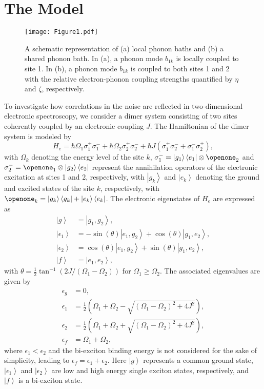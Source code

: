 \documentclass[%
 reprint,%
 amssymb, amsmath,%
 aip,cha,%
]{revtex4-1}
\newcommand{\bra}[1]{\ensuremath{\left\langle{#1}\right\vert}}
\newcommand{\ket}[1]{\ensuremath{\left|{#1}\right\rangle}}
\begin{document}

\section{The Model}

\begin{figure}[t]
	\texttt{[image: Figure1.pdf]}
	\caption{A schematic representation of (a) local phonon baths and (b) a shared phonon bath. In (a), a phonon mode $b_{1k}$ is locally coupled to site 1. In (b), a phonon mode $b_{1k}$ is coupled to both sites 1 and 2 with the relative electron-phonon coupling strengths quantified by $\eta$ and $\zeta$, respectively.}
	\label{figureindex1} 
\end{figure}

To investigate how correlations in the noise are reflected in two-dimensional electronic spectroscopy, we consider a dimer system consisting of two sites coherently coupled by an electronic coupling $J$. The Hamiltonian of the dimer system is modeled by
\begin{equation}
	H_e=\hbar\Omega_1\sigma_{1}^{+}\sigma_{1}^{-}+\hbar\Omega_2\sigma_{2}^{+}\sigma^-_{2}+\hbar J(\sigma_{1}^{+}\sigma^-_{2}+\sigma_{1}^{-}\sigma^+_{2}),
\end{equation}
with $\Omega_k$ denoting the energy level of the site $k$, $\sigma^-_{1}=\ket{g_1}\bra{e_1}\otimes\openone_2$ and $\sigma^-_{2}=\openone_1\otimes\ket{g_2}\bra{e_2}$ represent the annihilation operators of the electronic excitation at sites 1 and 2, respectively, with $\ket{g_k}$ and $\ket{e_k}$ denoting the ground and excited states of the site $k$, respectively, with $\openone_k=\ket{g_k}\bra{g_k}+\ket{e_k}\bra{e_k}$. The electronic eigenstates of $H_e$ are expressed as
 \begin{align}
\ket{g}&=\ket{g_1,g_2},\\
\ket{\epsilon_1}&=-\sin(\theta)\ket{e_1,g_2}+\cos(\theta)\ket{g_1,e_2},\label{eq:evec1}\\
\ket{\epsilon_2}&=\cos(\theta)\ket{e_1,g_2}+\sin(\theta)\ket{g_1,e_2},\label{eq:evec2}\\
\ket{f}&=\ket{e_1,e_2},
 \end{align}
 with $\theta=\frac{1}{2}\tan^{-1}(2J/(\Omega_1-\Omega_2))$ for $\Omega_1\ge\Omega_2$. The associated eigenvalues are given by
 \begin{align}
\epsilon_g&=0,\\
\epsilon_1&=\frac{1}{2}\left(\Omega_1+\Omega_2-\sqrt{(\Omega_1-\Omega_2)^{2}+4J^{2}}\right),\label{eq:e1}\\
\epsilon_2&=\frac{1}{2}\left(\Omega_1+\Omega_2+\sqrt{(\Omega_1-\Omega_2)^{2}+4J^{2}}\right),\label{eq:e2}\\
\epsilon_f&=\Omega_1+\Omega_2,
 \end{align}
 where $\epsilon_1<\epsilon_2$ and the bi-exciton binding energy is not considered for the sake of simplicity, leading to $\epsilon_f=\epsilon_1+\epsilon_2$. Here $\ket{g}$ represents a common ground state, $\ket{\epsilon_1}$ and $\ket{\epsilon_2}$ are low and high energy single exciton states, respectively, and $\ket{f}$ is a bi-exciton state.
\end{document}
